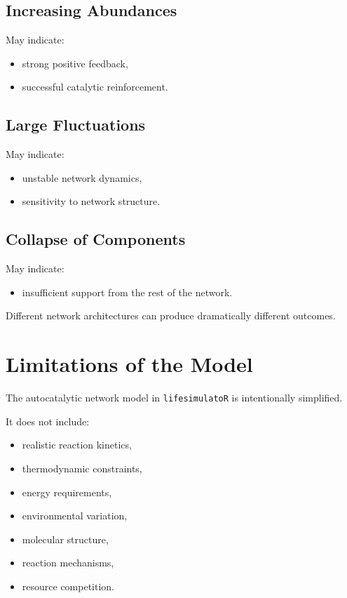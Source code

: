 \documentclass[
  oneside,
  openany]{book}
\providecommand{\tightlist}{%
  \setlength{\itemsep}{0pt}\setlength{\parskip}{0pt}}
\begin{document}
\subsection{Increasing Abundances}\label{increasing-abundances}

May indicate:

\begin{itemize}
\tightlist
\item
  strong positive feedback,
\item
  successful catalytic reinforcement.
\end{itemize}

\subsection{Large Fluctuations}\label{large-fluctuations}

May indicate:

\begin{itemize}
\tightlist
\item
  unstable network dynamics,
\item
  sensitivity to network structure.
\end{itemize}

\subsection{Collapse of Components}\label{collapse-of-components}

May indicate:

\begin{itemize}
\tightlist
\item
  insufficient support from the rest of the network.
\end{itemize}

Different network architectures can produce dramatically different outcomes.

\section{Limitations of the Model}\label{limitations-of-the-model-3}

The autocatalytic network model in \texttt{lifesimulatoR} is intentionally simplified.

It does not include:

\begin{itemize}
\tightlist
\item
  realistic reaction kinetics,
\item
  thermodynamic constraints,
\item
  energy requirements,
\item
  environmental variation,
\item
  molecular structure,
\item
  reaction mechanisms,
\item
  resource competition.
\end{itemize}
\end{document}
